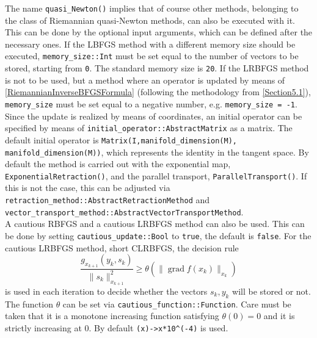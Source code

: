 The name \lstinline!quasi_Newton()! implies that of course other methods, belonging to the class of Riemannian quasi-Newton methods, can also be executed with it. This can be done by the optional input arguments, which can be defined after the necessary ones. If the LBFGS method with a different memory size should be executed, \lstinline!memory_size::Int! must be set equal to the number of vectors to be stored, starting from \lstinline!0!. The standard memory size is \lstinline!20!. If the LRBFGS method is not to be used, but a method where an operator is updated by means of \cref{RiemannianInverseBFGSFormula} (following the methodology from \cref{Section5.1}), \lstinline!memory_size! must be set equal to a negative number, e.g. \lstinline!memory_size = -1!. Since the update is realized by means of coordinates, an initial operator can be specified by means of \lstinline!initial_operator::AbstractMatrix! as a matrix. The default initial operator is \lstinline!Matrix(I,manifold_dimension(M), manifold_dimension(M))!, which represents the identity in the tangent space. By default the method is carried out with the exponential map, \lstinline!ExponentialRetraction()!, and the parallel transport, \lstinline!ParallelTransport()!. If this is not the case, this can be adjusted via \lstinline!retraction_method::AbstractRetractionMethod! and \lstinline!vector_transport_method::AbstractVectorTransportMethod!. \\ 
A cautious RBFGS and a cautious LRBFGS method can also be used. This can be done by setting \lstinline!cautious_update::Bool! to \lstinline!true!, the default is \lstinline!false!. For the cautious LRBFGS method, short CLRBFGS, the decision rule
\begin{equation}\label{CautiousTrigger}
    \frac{g_{x_{k+1}}(y_k,s_k)}{\lVert s_k \rVert^{2}_{x_{k+1}}} \geq \theta(\lVert \operatorname{grad} f(x_k) \rVert_{x_k})
\end{equation}
is used in each iteration to decide whether the vectors $s_k, y_k$ will be stored or not. The function $\theta$ can be set via \lstinline!cautious_function::Function!. Care must be taken that it is a monotone increasing function satisfying $\theta(0) = 0$ and it is strictly increasing at $0$. By default \lstinline!(x)->x*10^(-4)! is used. \\
